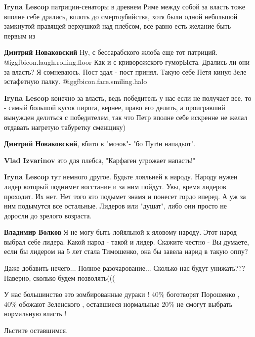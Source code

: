 \begin{itemize}
\begin{itemize} %
\textbf{Iryna Lescop} патриции-сенаторы в древнем Риме между собой за власть тоже вполне себе дрались, вплоть до смертоубийства, хотя были одной небольшой замкнутой правящей верхушкой над плебсом, все равно есть желание быть первым из

\textbf{Дмитрий Новаковский} Ну, с бессарабского жлоба еще тот патриций.  @igg{fbicon.laugh.rolling.floor} Как и с криворожского гуморЫста. Дрались ли они за власть? Я сомневаюсь. Пост здал - пост принял. Такую себе Петя кинул Зеле эстафетную палку.  @igg{fbicon.face.smiling.halo} 

\textbf{Iryna Lescop} конечно за власть, ведь победитель у нас если не получает все, то - самый большой кусок пирога, вернее, право его делить, а проигравший вынужден делиться с победителем, так что Петр вполне себе искренне не желал отдавать нагретую табуретку сменщику)

\textbf{Дмитрий Новаковский}, вбито в "мозок"-
"бо Путiн нападьот".

\textbf{Vlad Izvarinov} это для плебса, "Карфаген угрожает напасть!"

\textbf{Iryna Lescop} тут немного другое. Будьте лояльней к народу.
Народу нужен лидер который поднимет восстание и за ним пойдут. Увы, время лидеров проходит. Их нет. Нет того кто подымет знамя и понесет гордо вперед. А уж за ним подымутся все остальные. Лидеров или "душат", либо они просто не доросли до зрелого возраста.

\textbf{Владимир Волков} Я не могу быть лойяльной к яловому народу. Этот народ выбрал себе лидера. Какой народ - такой и лидер. Скажите честно - Вы думаете, если бы лидером на 5 лет стала Тимошенко, она бы завела нарид в такую оппу?

\end{itemize} %


Даже добавить нечего... Полное разочарование... Сколько нас будут унижать???
Наверно, сколько будем позволять(((


У нас большинство это зомбированные дураки ! 40\% боготворят Порошенко , 40\%
обожают Зеленского , оставшиеся нормальные 20\% не смогут выбрать нормальную
власть !

\begin{itemize} %
Льстите оставшимся.


\end{itemize}
\end{itemize}
